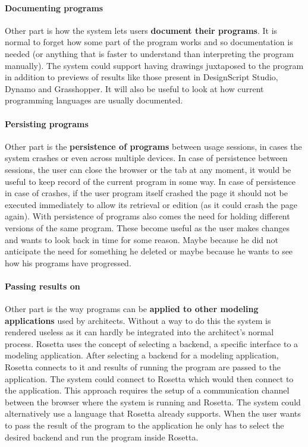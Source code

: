 \documentclass{./llncs2e/llncs}
\begin{document}
	\paragraph{Documenting programs}
	Other part is how the system lets users \textbf{document their programs}. 
	It is normal to forget how some part of the program works and so documentation is needed (or anything that is faster to understand than interpreting the program manually).
	The system could support having drawings juxtaposed to the program in addition to previews of results like those present in DesignScript Studio, Dynamo and Grasshopper. 
	It will also be useful to look at how current programming languages are usually documented. 

	\paragraph{Persisting programs}
	Other part is the \textbf{persistence of programs} between usage sessions, in cases the system crashes or even across multiple devices.
	In case of persistence between sessions, the user can close the browser or the tab at any moment, it would be useful to keep record of the current program in some way. 
	In case of persistence in case of crashes, if the user program itself crashed the page it should not be executed immediately to allow its retrieval or edition (as it could crash the page again). 
	With persistence of programs also comes the need for holding different versions of the same program. 
	These become useful as the user makes changes and wants to look back in time for some reason. 
	Maybe because he did not anticipate the need for something he deleted or maybe because he wants to see how his programs have progressed.

	\paragraph{Passing results on}
	Other part is the way programs can be \textbf{applied to other modeling applications} used by architects.
	Without a way to do this the system is rendered useless as it can hardly be integrated into the architect's normal process. 
	Rosetta uses the concept of selecting a backend, a specific interface to a modeling application. 
	After selecting a backend for a modeling application, Rosetta connects to it and results of running the program are passed to the application. 
	The system could connect to Rosetta which would then connect to the application. 
	This approach requires the setup of a communication channel between the browser where the system is running and Rosetta. 
	The system could alternatively use a language that Rosetta already supports. 
	When the user wants to pass the result of the program to the application he only has to select the desired backend and run the program inside Rosetta.
\end{document}
